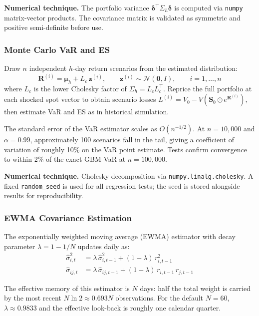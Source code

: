 \documentclass[11pt]{article}
\newcommand{\code}[1]{\texttt{#1}}
\begin{document}
\textbf{Numerical technique.}  The portfolio variance
$\boldsymbol{\delta}^\top\Sigma_h\boldsymbol{\delta}$ is computed via
\code{numpy} matrix-vector products.  The covariance matrix is validated
as symmetric and positive semi-definite before use.

\subsubsection{Monte Carlo VaR and ES}

Draw $n$ independent $h$-day return scenarios from the estimated distribution:
\[
\mathbf{R}^{(i)} = \boldsymbol{\mu}_h + L_c\,\mathbf{z}^{(i)},
\qquad \mathbf{z}^{(i)} \sim \mathcal{N}(\mathbf{0},I),
\qquad i=1,\ldots,n
\]
where $L_c$ is the lower Cholesky factor of $\Sigma_h = L_c L_c^\top$.
Reprice the full portfolio at each shocked spot vector to obtain scenario
losses $L^{(i)} = V_0 - V(\mathbf{S}_0 \odot e^{\mathbf{R}^{(i)}})$,
then estimate VaR and ES as in historical simulation.

The standard error of the VaR estimator scales as $O(n^{-1/2})$.  At
$n=10{,}000$ and $\alpha=0.99$, approximately 100 scenarios fall in the
tail, giving a coefficient of variation of roughly 10\% on the VaR
point estimate.  Tests confirm convergence to within 2\% of the exact
GBM VaR at $n=100{,}000$.

\textbf{Numerical technique.}  Cholesky decomposition via
\code{numpy.linalg.cholesky}.  A fixed \code{random\_seed} is used for
all regression tests; the seed is stored alongside results for
reproducibility.

\subsubsection{EWMA Covariance Estimation}

The exponentially weighted moving average (EWMA) estimator with decay
parameter $\lambda = 1 - 1/N$ updates daily as:
\begin{align}
\hat{\sigma}_{i,t}^2
  &= \lambda\,\hat{\sigma}_{i,t-1}^2 + (1-\lambda)\,r_{i,t-1}^2
  \label{eq:ewma-var}\\
\hat{\sigma}_{ij,t}
  &= \lambda\,\hat{\sigma}_{ij,t-1} + (1-\lambda)\,r_{i,t-1}\,r_{j,t-1}
  \label{eq:ewma-cov}
\end{align}

The effective memory of this estimator is $N$ days: half the total
weight is carried by the most recent $N\ln 2 \approx 0.693N$
observations.  For the default $N=60$, $\lambda \approx 0.9833$ and
the effective look-back is roughly one calendar quarter.
\end{document}
